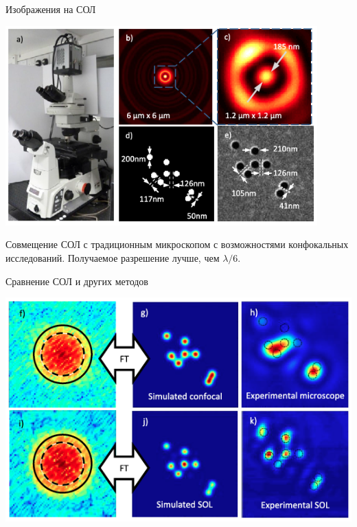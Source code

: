 \documentclass[9pt, compress, xcolor=table]{beamer}
\begin{document}
\begin{frame}{Изображения на СОЛ}
\begin{center}
\includegraphics[width=0.9\textwidth]{nh15}

Совмещение СОЛ с традиционным микроскопом с возможностями конфокальных исследований. Получаемое разрешение лучше, чем $\lambda/6$.

\end{center}
\end{frame}


\begin{frame}{Сравнение СОЛ и других методов}
\begin{center}
\includegraphics[width=\textwidth]{nh16}
\end{center}

\end{frame}
\end{document}
